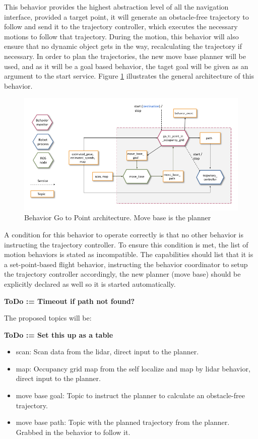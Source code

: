   This behavior provides the highest abstraction level of all the navigation interface, provided a target point, it will generate an obstacle-free trajectory to follow and send it to the trajectory controller, which executes the necessary motions to follow that trajectory. During the motion, this behavior will also ensure that no dynamic object gets in the way, recalculating the trajectory if necessary. In order to plan the trajectories, the new move base planner will be used, and as it will be a goal based behavior, the taget goal will be given as an argument to the start service. Figure \ref{ch_4:fig:behav_gtp} illustrates the general architecture of this behavior.

  \begin{figure}
    \centering
    \includegraphics[width=\textwidth]{./Figures/BehaviorGTPArquitecture.png}
    \caption{Behavior Go to Point architecture. Move base is the planner}
    \label{ch_4:fig:behav_gtp}
  \end{figure}

  A condition for this behavior to operate correctly is that no other behavior is instructing the trajectory controller. To ensure this condition is met, the list of motion behaviors is stated as incompatible. The capabilities should list that it is a set-point-based flight behavior, instructing the behavior coordinator to setup the trajectory controller accordingly, the new planner (move base) should be explicitly declared as well so it is started automatically.

  \textbf{ToDo := Timeout if path not found?}

  The proposed topics will be:

  \textbf{ToDo := Set this up as a table}

  \begin{itemize}
    \item scan: Scan data from the lidar, direct input to the planner.
    \item map: Occupancy grid map from the self localize and map by lidar behavior, direct input to the planner.
    \item move base goal: Topic to instruct the planner to calculate an obstacle-free trajectory.
    \item move base path: Topic with the planned trajectory from the planner. Grabbed in the behavior to follow it.
  \end{itemize}


